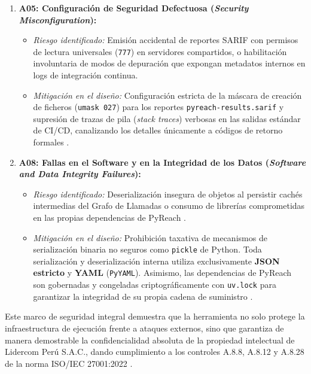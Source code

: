 \begin{enumerate}
    \item \textbf{A05: Configuración de Seguridad Defectuosa (\textit{Security Misconfiguration}):}
    \begin{itemize}
        \item \textit{Riesgo identificado:} Emisión accidental de reportes SARIF con permisos de lectura universales (\texttt{777}) en servidores compartidos, o habilitación involuntaria de modos de depuración que expongan metadatos internos en logs de integración continua.
        \item \textit{Mitigación en el diseño:} Configuración estricta de la máscara de creación de ficheros (\texttt{umask 027}) para los reportes \texttt{pyreach-\allowbreak results.\allowbreak sarif} y supresión de trazas de pila (\textit{stack traces}) verbosas en las salidas estándar de CI/CD, canalizando los detalles únicamente a códigos de retorno formales \cite{oasis2019sarif, humble2010continuous}.
    \end{itemize}

    \item \textbf{A08: Fallas en el Software y en la Integridad de los Datos (\textit{Software and Data Integrity Failures}):}
    \begin{itemize}
        \item \textit{Riesgo identificado:} Deserialización insegura de objetos al persistir cachés intermedias del Grafo de Llamadas o consumo de librerías comprometidas en las propias dependencias de PyReach \cite{ladisa2023sok}.
        \item \textit{Mitigación en el diseño:} Prohibición taxativa de mecanismos de serialización binaria no seguros como \texttt{pickle} de Python. Toda serialización y deserialización interna utiliza exclusivamente \textbf{JSON estricto} y \textbf{YAML} (\texttt{PyYAML}). Asimismo, las dependencias de PyReach son gobernadas y congeladas criptográficamente con \texttt{uv.\allowbreak lock} para garantizar la integridad de su propia cadena de suministro \cite{ladisa2023sok}.
    \end{itemize}
\end{enumerate}

Este marco de seguridad integral demuestra que la herramienta no solo protege la infraestructura de ejecución frente a ataques externos, sino que garantiza de manera demostrable la confidencialidad absoluta de la propiedad intelectual de Lidercom Perú S.A.C., dando cumplimiento a los controles A.8.8, A.8.12 y A.8.28 de la norma ISO/IEC 27001:2022 \cite{gutierrez2024auditoria}.

